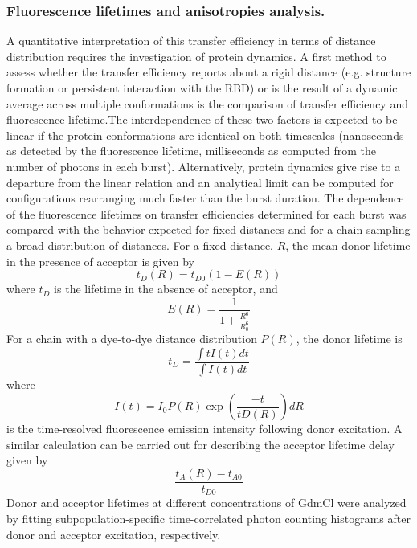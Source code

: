 \documentclass[../main.tex]{subfiles}
\begin{document}
    \subsubsection{Fluorescence lifetimes and anisotropies analysis.}
        A quantitative interpretation of this transfer efficiency in terms of distance distribution requires the investigation of protein dynamics. A first method to assess whether the transfer efficiency reports about a rigid distance (e.g. structure formation or persistent interaction with the RBD) or is the result of a dynamic average across multiple conformations is the comparison of transfer efficiency and fluorescence lifetime.The interdependence of these two factors is expected to be linear if the protein conformations are identical on both timescales (nanoseconds as detected by the fluorescence lifetime, milliseconds as computed from the number of photons in each burst). Alternatively, protein dynamics give rise to a departure from the linear relation and an analytical limit can be computed for configurations rearranging much faster than the burst duration. The dependence of the fluorescence lifetimes on transfer efficiencies determined for each burst was compared with the behavior expected for fixed distances and for a chain sampling a broad distribution of distances. For a fixed distance, $R$, the mean donor lifetime in the presence of acceptor is given by 
        \begin{equation}\label{appendix-e-eq2}
            t_D(R)=t_{D0}(1-E(R))
        \end{equation} 
        where $t_D$ is the lifetime in the absence of acceptor, and
        \begin{equation}\label{appendix-e-eq3}
            E(R) = \frac{1}{1+\frac{R^{6}}{R_0^6}}
        \end{equation} 
        For a chain with a dye-to-dye distance distribution $P(R)$, the donor lifetime is
        \begin{equation}\label{appendix-e-eq4}
            t_D = \frac{\int{tI(t)dt}}{\int{I(t)dt}}
        \end{equation}
        where 
        \begin{equation}\label{appendix-e-eq5}
            I(t) = I_0P(R)\exp{(\frac{-t}{tD(R)})}dR
        \end{equation}
        is the time-resolved fluorescence emission intensity following donor excitation. A similar calculation can be carried out for describing the acceptor lifetime\cite{Chung2016-fp} delay given by 
        \begin{equation}\label{appendix-e-eq6}
            \frac{t_A(R)-t_{A0}}{t_{D0}}
        \end{equation}
        Donor and acceptor lifetimes at different concentrations of GdmCl were analyzed by fitting subpopulation-specific time-correlated photon counting histograms after donor and acceptor excitation, respectively. 
\end{document}
